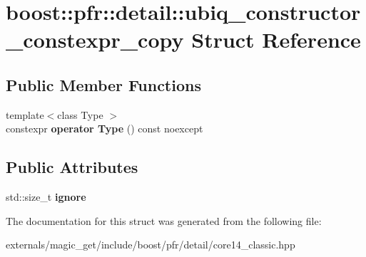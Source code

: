 \hypertarget{structboost_1_1pfr_1_1detail_1_1ubiq__constructor__constexpr__copy}{}\section{boost\+:\+:pfr\+:\+:detail\+:\+:ubiq\+\_\+constructor\+\_\+constexpr\+\_\+copy Struct Reference}
\label{structboost_1_1pfr_1_1detail_1_1ubiq__constructor__constexpr__copy}
\subsection*{Public Member Functions}
\begin{DoxyCompactItemize}
\item 
\mbox{\label{structboost_1_1pfr_1_1detail_1_1ubiq__constructor__constexpr__copy_aff3f1d356485ca69a437484f77c4126a}} 
{\footnotesize template$<$class Type $>$ }\\constexpr {\bfseries operator Type} () const noexcept
\end{DoxyCompactItemize}
\subsection*{Public Attributes}
\begin{DoxyCompactItemize}
\item 
\mbox{\label{structboost_1_1pfr_1_1detail_1_1ubiq__constructor__constexpr__copy_ae88c56e8c62e5258acfcb8a9e5bcc38c}} 
std\+::size\+\_\+t {\bfseries ignore}
\end{DoxyCompactItemize}


The documentation for this struct was generated from the following file\+:\begin{DoxyCompactItemize}
\item 
externals/magic\+\_\+get/include/boost/pfr/detail/core14\+\_\+classic.\+hpp\end{DoxyCompactItemize}
